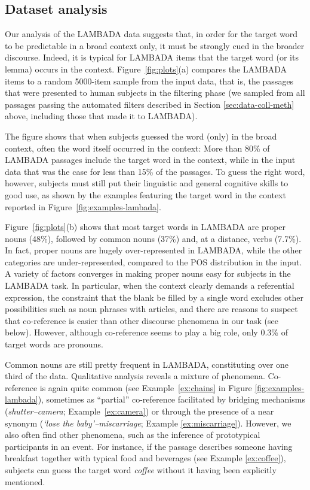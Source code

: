 \subsection{Dataset analysis}
\label{sec:analysis}

Our analysis of the LAMBADA data suggests that, in order for the target word to be predictable in a broad context only, it must be strongly cued in the broader discourse. Indeed, it is typical for LAMBADA items that the target word (or its lemma) occurs in the context. Figure~\ref{fig:plots}(a) compares the LAMBADA items to a random 5000-item sample from the input data, that is, the passages that were presented to human subjects in the filtering phase (we sampled from all passages passing the automated filters described in Section
\ref{sec:data-coll-meth} above,  including those that made it to LAMBADA). 

The figure shows that when subjects guessed the word (only) in the broad context, often the word itself occurred in the context: More than 80\% of LAMBADA passages include the target word in the context, while in the input data that was the case for less than 15\% of the passages. To guess the right word, however, subjects must still put their linguistic and general cognitive skills to good use, as shown by the examples featuring the target word in the context reported in
Figure~\ref{fig:examples-lambada}.

Figure~\ref{fig:plots}(b) shows that most target words in LAMBADA are proper nouns (48\%), followed by common nouns (37\%) and, at a distance, verbs (7.7\%). In fact, proper nouns are hugely over-represented in LAMBADA, while the other categories are under-represented, compared to the POS distribution in the input. A variety of factors converges in making proper nouns easy for subjects in the LAMBADA task. In particular, when the context clearly demands a referential expression, the constraint that the blank be filled by a single word excludes other possibilities such as noun phrases with articles, and there are reasons to suspect that co-reference is easier than other discourse phenomena in our task (see below). However, although co-reference seems to play a big role, only 0.3\% of target words are pronouns.

Common nouns are still pretty frequent in LAMBADA, constituting over one third of the data. Qualitative analysis reveals a mixture of phenomena. Co-reference is again quite common (see
Example~\ref{ex:chains} in Figure \ref{fig:examples-lambada}),
sometimes as ``partial'' co-reference facilitated by bridging mechanisms ({\em shutter--camera}; Example~\ref{ex:camera})
or through the presence of a near synonym ({\em`lose the baby'--miscarriage}; Example \ref{ex:miscarriage}). However, we also often find other phenomena, such as the inference of prototypical participants in an event. For instance, if the passage describes someone having breakfast together with typical food and beverages (see Example
\ref{ex:coffee}), subjects can guess the target word \emph{coffee} without it having been explicitly mentioned.

